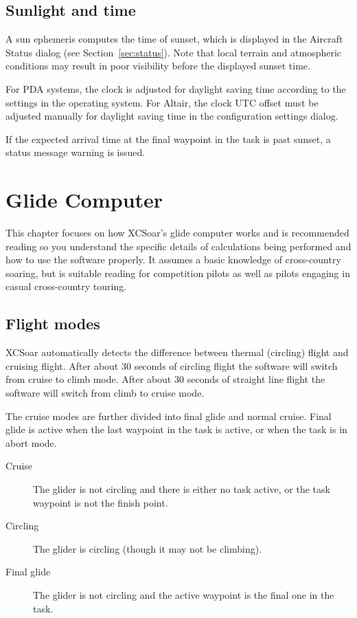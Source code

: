 \documentclass[a4paper,12pt]{refrep}
\begin{document}
\section{Sunlight and time}

A sun ephemeris computes the time of sunset, which is displayed in the
Aircraft Status dialog (see Section~\ref{sec:status}).  Note that
local terrain and atmospheric conditions may result in poor visibility
before the displayed sunset time.

For PDA systems, the clock is adjusted for daylight saving time according
to the settings in the operating system.  For Altair, the clock UTC offset
must be adjusted manually for daylight saving time in the configuration
settings dialog.

If the expected arrival time at the final waypoint in the task is past
sunset, a status message warning is issued.

\chapter{Glide Computer}\label{cha:glide}
This chapter focuses on how XCSoar's glide computer works and is
recommended reading so you understand the specific details of
calculations being performed and how to use the software properly.  It
assumes a basic knowledge of cross-country soaring, but is suitable
reading for competition pilots as well as pilots engaging in casual
cross-country touring.

\section{Flight modes} 

XCSoar automatically detects the difference between thermal (circling)
flight and cruising flight. After about 30 seconds of circling flight
the software will switch from cruise to climb mode. After about 30
seconds of straight line flight the software will switch from climb to
cruise mode.

The cruise modes are further divided into final glide and normal
cruise.  Final glide is active when the last waypoint in the task is
active, or when the task is in abort mode.

\begin{description}
\item[Cruise]   The glider is not circling and there is either no task
  active, or the task waypoint is not the finish point.
\item[Circling]  The glider is circling (though it may not be climbing).
\item[Final glide]  The glider is not circling and the active waypoint is the
 final one in the task.
\end{description}
\end{document}
